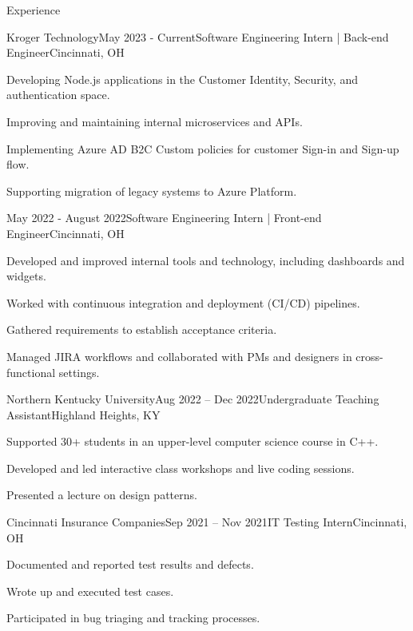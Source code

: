 \documentclass[11pt]{resume}
\begin{document}
\begin{rSection}{Experience}

	\begin{rSubsection}{Kroger Technology}{May 2023 - Current}{Software Engineering Intern | Back-end Engineer}{Cincinnati, OH}
        \item Developing Node.js applications in the Customer Identity, Security, and authentication space. 
        \item Improving and maintaining internal microservices and APIs.
        \item Implementing Azure AD B2C Custom policies for customer Sign-in and Sign-up flow.
        \item Supporting migration of legacy systems to Azure Platform.
	\end{rSubsection}

    \begin{rSubsection}{}{May 2022 - August 2022}{Software Engineering Intern | Front-end Engineer}{Cincinnati, OH}
        \item Developed and improved internal tools and technology, including dashboards and widgets.
        \item Worked with continuous integration and deployment (CI/CD) pipelines.
        \item Gathered requirements to establish acceptance criteria.
        \item Managed JIRA workflows and collaborated with PMs and designers in cross-functional settings.
    \end{rSubsection}

    \begin{rSubsection}{Northern Kentucky University}{Aug 2022 – Dec 2022}{Undergraduate Teaching Assistant}{Highland Heights, KY}
        \item Supported 30+ students in an upper-level computer science course in C++.
        \item Developed and led interactive class workshops and live coding sessions.
        \item Presented a lecture on design patterns.
    \end{rSubsection}

    \begin{rSubsection}{Cincinnati Insurance Companies}{Sep 2021 – Nov 2021}{IT Testing Intern}{Cincinnati, OH}
        \item Documented and reported test results and defects.
        \item Wrote up and executed test cases.
        \item Participated in bug triaging and tracking processes.
    \end{rSubsection}
	
\end{rSection}
\end{document}
